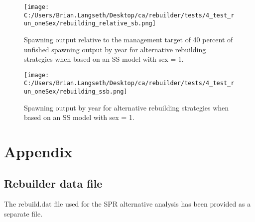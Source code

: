 \documentclass[11pt,
  english,
  a4paper,
]{article}
\begin{document}
\tagmcend\tagstructend


\begin{figure}
\centering
\texttt{[image: C:/Users/Brian.Langseth/Desktop/ca/rebuilder/tests/4\_test\_run\_oneSex/rebuilding\_relative\_sb.png]}
\caption{Spawning output relative to the management target of 40 percent of unfished spawning output by year for alternative rebuilding strategies when based on an SS model with sex = 1.\label{fig:rel-ssb-fig-sex1}}
\end{figure}

\tagmcend\tagstructend


\begin{figure}
\centering
\texttt{[image: C:/Users/Brian.Langseth/Desktop/ca/rebuilder/tests/4\_test\_run\_oneSex/rebuilding\_ssb.png]}
\caption{Spawning output by year for alternative rebuilding strategies when based on an SS model with sex = 1.\label{fig:rel-ssb-fig-sex1}}
\end{figure}

\tagmcend\tagstructend

\clearpage


\hypertarget{appendix}{%
\section{Appendix}\label{appendix}}

\leavevmode\tagmcend\tagstructend


\hypertarget{rebuilder-data-file}{%
\subsection{Rebuilder data file}\label{rebuilder-data-file}}

\leavevmode\tagmcend\tagstructend


The rebuild.dat file used for the SPR alternative analysis has been provided as a separate file.

\leavevmode\tagmcend\tagstructend\par
\end{document}
